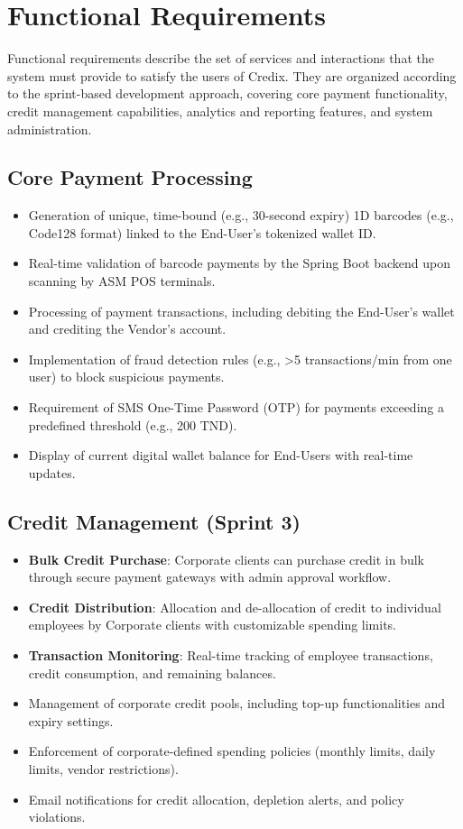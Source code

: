 \section{Functional Requirements}

Functional requirements describe the set of services and interactions that the system must provide to satisfy the users of Credix. They are organized according to the sprint-based development approach, covering core payment functionality, credit management capabilities, analytics and reporting features, and system administration.

\subsection{Core Payment Processing}
\begin{itemize}
    \item Generation of unique, time-bound (e.g., 30-second expiry) 1D barcodes (e.g., Code128 format) linked to the End-User's tokenized wallet ID.
    \item Real-time validation of barcode payments by the Spring Boot backend upon scanning by ASM POS terminals.
    \item Processing of payment transactions, including debiting the End-User's wallet and crediting the Vendor's account.
    \item Implementation of fraud detection rules (e.g., >5 transactions/min from one user) to block suspicious payments.
    \item Requirement of SMS One-Time Password (OTP) for payments exceeding a predefined threshold (e.g., 200 TND).
    \item Display of current digital wallet balance for End-Users with real-time updates.
\end{itemize}

\subsection{Credit Management (Sprint 3)}
\begin{itemize}
    \item \textbf{Bulk Credit Purchase}: Corporate clients can purchase credit in bulk through secure payment gateways with admin approval workflow.
    \item \textbf{Credit Distribution}: Allocation and de-allocation of credit to individual employees by Corporate clients with customizable spending limits.
    \item \textbf{Transaction Monitoring}: Real-time tracking of employee transactions, credit consumption, and remaining balances.
    \item Management of corporate credit pools, including top-up functionalities and expiry settings.
    \item Enforcement of corporate-defined spending policies (monthly limits, daily limits, vendor restrictions).
    \item Email notifications for credit allocation, depletion alerts, and policy violations.
\end{itemize}

